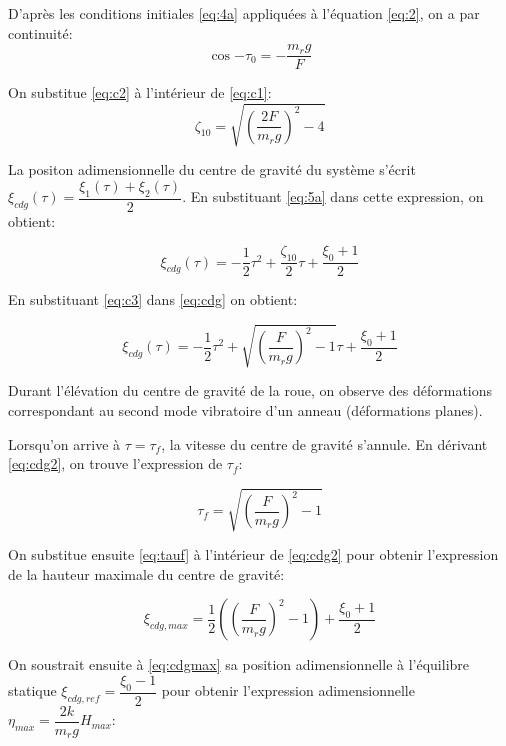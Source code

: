 D'après les conditions initiales \ref{eq:4a} appliquées à l'équation \ref{eq:2}, on a par continuité:
\begin{equation}
    \cos{-\tau_0}=-\frac{m_r g}{F}
    \label{eq:c2}
\end{equation}

On substitue \ref{eq:c2} à l'intérieur de \ref{eq:c1}:
\begin{equation}
    \zeta_{10}=\sqrt{(\frac{2F}{m_r g})^2-4}
    \label{eq:c3}
\end{equation}

La positon adimensionnelle du centre de gravité du système s'écrit $\xi_{cdg}(\tau)=\dfrac{\xi_1(\tau)+\xi_2(\tau)}{2}$. En substituant \ref{eq:5a} dans cette expression, on obtient: 

\begin{equation}
  \xi_{cdg}(\tau)=-\frac{1}{2}\tau^2+\frac{\zeta_{10}}{2}\tau+\frac{\xi_0+1}{2}
  \label{eq:cdg}
\end{equation}

En substituant \ref{eq:c3} dans \ref{eq:cdg} on obtient:

\begin{equation}
  \xi_{cdg}(\tau)=-\frac{1}{2}\tau^2+\sqrt{(\frac{F}{m_r g})^2-1}\tau+\frac{\xi_0+1}{2}
  \label{eq:cdg2}
\end{equation}

Durant l'élévation du centre de gravité de la roue, on observe des déformations correspondant au second mode vibratoire d'un anneau (déformations planes).

Lorsqu'on arrive à $\tau=\tau_f$, la vitesse du centre de gravité s'annule. En dérivant \ref{eq:cdg2}, on trouve l'expression de $\tau_f$:

\begin{equation}
    \tau_f=\sqrt{(\frac{F}{m_r g})^2-1}
    \label{eq:tauf}
\end{equation}

On substitue ensuite \ref{eq:tauf} à l'intérieur de \ref{eq:cdg2} pour obtenir l'expression de la hauteur maximale du centre de gravité:

\begin{equation}
  \xi_{cdg,max}=\frac{1}{2}((\frac{F}{m_r g})^2-1)+\frac{\xi_0+1}{2}
  \label{eq:cdgmax}
\end{equation}

On soustrait ensuite à \ref{eq:cdgmax} sa position adimensionnelle à l'équilibre statique $\xi_{cdg,ref}=\dfrac{\xi_0-1}{2}$ pour obtenir l'expression adimensionnelle $\eta_{max}=\dfrac{2k}{m_rg}H_{max}$:


